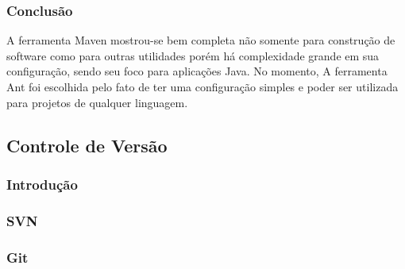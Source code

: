 \documentclass[12pt,a4paper]{article}
\begin{document}
		\subsubsection{Conclusão}
		
			A ferramenta Maven mostrou-se bem completa não somente para construção de software como para outras utilidades porém
			há complexidade grande em sua configuração, sendo seu foco para aplicações Java. No momento, A ferramenta Ant foi
			escolhida pelo fato de ter uma configuração simples e poder ser utilizada para projetos de qualquer linguagem.
	
	\clearpage		
	\subsection{Controle de Versão}
		\subsubsection{Introdução}
		\subsubsection{SVN}
		\subsubsection{Git}
\end{document}
